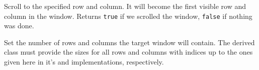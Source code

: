 \label{wxvarhvscrollhelperscrolltorowcolumn}



Scroll to the specified row and column. It will become the first visible row
and column in the window. Returns {\tt true} if we scrolled the window,
{\tt false} if nothing was done.


\label{wxvarhvscrollhelpersetrowcolumncount}


Set the number of rows and columns the target window will contain. The
derived class must provide the sizes for all rows and columns with indices up
to the ones given here in it's 
and  implementations,
respectively.



